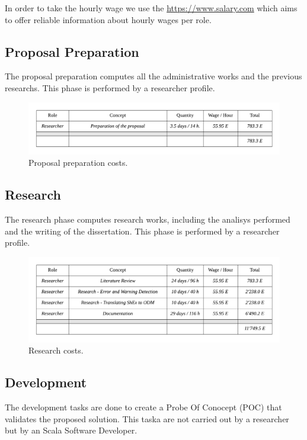 In order to take the hourly wage we use the \url{https://www.salary.com} which aims to offer reliable
information about hourly wages per role.

\subsection{Proposal Preparation}
The proposal preparation computes all the administrative works and the previous researchs. This phase is performed
by a researcher profile.

\begin{figure}[h!]
    \includegraphics[width=\textwidth]{images/budget-proposal.pdf}
    \centering
	\caption[Proposal preparation costs]{Proposal preparation costs.}
    \label{fig:budget-proposal}
\end{figure}

\subsection{Research}
The research phase computes research works, including the analisys performed and the writing of the dissertation.
This phase is performed by a researcher profile.

\begin{figure}[h!]
    \includegraphics[width=\textwidth]{images/budget-research.pdf}
    \centering
	\caption[Research costs]{Research costs.}
    \label{fig:budget-research}
\end{figure}

\subsection{Development}
The development tasks are done to create a Probe Of Conocept (POC) that validates the proposed solution. This taska are not carried out by a researcher
but by an Scala Software Developer.


